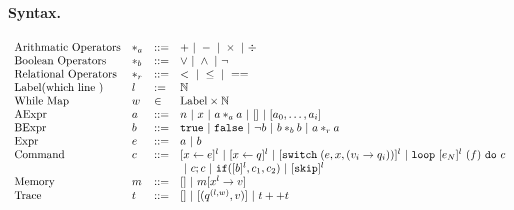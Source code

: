 \documentclass[a4paper,11pt]{article}
\begin{document}
\paragraph{Syntax.}
\[
\begin{array}{llll}
 \mbox{Arithmatic Operators} & *_a & ::= & + ~|~ - ~|~ \times 
%
~|~ \div \\  
  \mbox{Boolean Operators} & *_b & ::= & \lor ~|~ \land ~|~ \neg\\
   \mbox{Relational Operators} & *_r & ::= & < ~|~ \leq ~|~ == \\  
 \mbox{Label(which line )} & l & := & \mathbb{N} \\ 
 \mbox{While Map} & w & \in & \mbox{Label} \times \mathbb{N} \\
\mbox{AExpr} & \aexpr & ::= & 
	n ~|~ x ~|~ \aexpr *_a \aexpr ~|~ [] ~|~ [\aexpr_0, \dots, \aexpr_i] \\
\mbox{BExpr} & \bexpr & ::= & 
	\etrue ~|~ \efalse  ~|~ \neg \bexpr
	 ~|~ \bexpr *_b \bexpr
	~|~ \aexpr *_r \aexpr \\
\mbox{Expr} & \expr & ::= & \aexpr \sep \bexpr \\	
\mbox{Command} & c & ::= &   [\assign x \expr]^{l} ~|~  [\assign x q]^{l}
%
~|~ {[\eswitch( \expr, x, (v_i \to  q_i))]^{l} \sep \eloop ~ [\expr_N]^{l} ~ (f) ~ \edo ~ c }  \\ 
& & & ~|~  c ; c ~|~ \eif([\bexpr]^{l}, c_1, c_2) 
	 ~|~ [\eskip]^{l} 
	\\
\mbox{Memory} & m & ::= & [] ~|~ m[x^{l} \to v] \\
%
\mbox{Trace} & t & ::= & [] ~|~ [(q^{(l, w) }, v)] ~|~ t ++ t
\end{array}
\]
%
\end{document}
